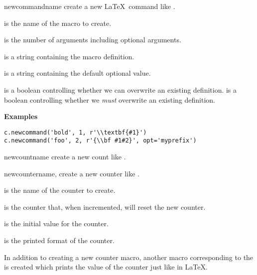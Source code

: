 \begin{methoddesc}[Context]{newcommand}{name}
create a new \LaTeX\ command like .

 is the name of the macro to create.

 is the number of arguments including optional arguments.

 is a string containing the macro definition.

 is a string containing the default optional value.

 is a boolean controlling whether we can overwrite an existing definition.
 is a boolean controlling whether we \emph{must} overwrite an existing definition.

\textbf{Examples}
\begin{verbatim}
c.newcommand('bold', 1, r'\\textbf{#1}')
c.newcommand('foo', 2, r'{\\bf #1#2}', opt='myprefix')
\end{verbatim}
\end{methoddesc}

\begin{methoddesc}[Context]{newcount}{name}
create a new count like .
\end{methoddesc}

\begin{methoddesc}[Context]{newcounter}{name, }
create a new counter like .

 is the name of the counter to create.

 is the counter that, when incremented, will reset the
new counter.

 is the initial value for the counter.

 is the printed format of the counter.

In addition to creating a new counter macro, another macro corresponding
to the  is created which prints the value of the
counter just like in \LaTeX.
\end{methoddesc}

